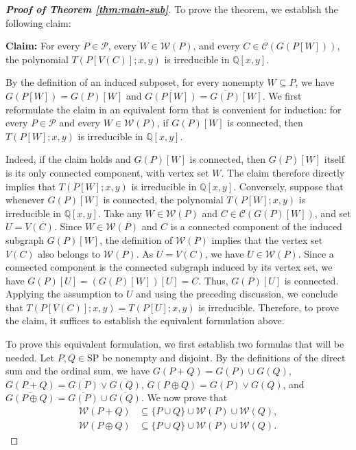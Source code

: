 \documentclass[11pt,a4paper]{article}
\begin{document}
\begin{proof}[\rm\textbf{Proof of Theorem \ref{thm:main-sub}}]
To prove the theorem, we establish the following claim:

\textbf{Claim:}
For every $P\in\mathcal P$, every $W\in\mathcal W(P)$, and every $C\in\mathcal C(G(P[W]))$,
the polynomial $T(P[V(C)];x,y)$ is irreducible in $\mathbb Q[x,y]$.

By the definition of an induced subposet, for every nonempty $W\subseteq P$, 
we have $G(P[W])=G(P)[W]$ and $\overline{G(P[W])}=\overline{G(P)}[W]$.
We first reformulate the claim in an equivalent form that is convenient for induction:
for every $P\in\mathcal P$ and every $W\in\mathcal W(P)$,
if $G(P)[W]$ is connected, then $T(P[W];x,y)$ is irreducible in $\mathbb Q[x,y]$.

Indeed, if the claim holds and $G(P)[W]$ is connected,
then $G(P)[W]$ itself is its only connected component, with vertex set $W$.
The claim therefore directly implies that $T(P[W];x,y)$ is irreducible in $\mathbb Q[x,y]$.
Conversely, suppose that whenever $G(P)[W]$ is connected,
the polynomial $T(P[W];x,y)$ is irreducible in $\mathbb Q[x,y]$.
Take any $W\in\mathcal W(P)$ and $C\in\mathcal C(G(P)[W])$, and set $U=V(C)$.
Since $W\in\mathcal W(P)$ and $C$ is a connected component of the induced subgraph $G(P)[W]$,
the definition of $\mathcal W(P)$ implies that the vertex set $V(C)$ also belongs to $\mathcal W(P)$.
As $U=V(C)$, we have $U\in\mathcal W(P)$.
Since a connected component is the connected subgraph induced by its vertex set, 
we have $G(P)[U]=(G(P)[W])[U]=C$.
Thus, $G(P)[U]$ is connected.
Applying the assumption to $U$ and using the preceding discussion,
we conclude that $T(P[V(C)];x,y)=T(P[U];x,y)$ is irreducible.
Therefore, to prove the claim, it suffices to establish the equivalent formulation above.

To prove this equivalent formulation,
we first establish two formulas that will be needed.
Let $P,Q\in\mathrm{SP}$ be nonempty and disjoint.
By the definitions of the direct sum and the ordinal sum, we have
$G(P+Q)=G(P)\cup G(Q)$, $\overline{G(P+Q)}=\overline{G(P)}\vee\overline{G(Q)}$,
$G(P\oplus Q)=G(P)\vee G(Q)$, and $\overline{G(P\oplus Q)}=\overline{G(P)}\cup\overline{G(Q)}$.
We now prove that
\begin{align}
\mathcal W(P+Q)
&\subseteq\{P\cup Q\}\cup\mathcal W(P)\cup\mathcal W(Q),\label{eq:cor3343-W-direct}\\
\mathcal W(P\oplus Q)
&\subseteq\{P\cup Q\}\cup\mathcal W(P)\cup\mathcal W(Q).\label{eq:cor3343-W-ordinal}
\end{align}


\end{proof}
\end{document}

